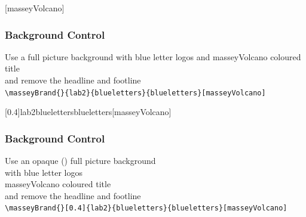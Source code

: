 \documentclass[10pt,aspectratio=43]{beamer}
\begin{document}
[masseyVolcano]

\begin{frame}
\frametitle{Background Control}
Use a full picture background with blue letter logos and masseyVolcano coloured title \\
and remove the headline and footline\\[2ex]
\verb|\masseyBrand{}{lab2}{blueletters}{blueletters}[masseyVolcano]|
\end{frame}

\masseyBrand{}[0.4]{lab2}{blueletters}{blueletters}[masseyVolcano]

\begin{frame}
\frametitle{Background Control}
\color{black}
Use an opaque (\backgroundfileopacity) full picture background \\with blue letter logos \\masseyVolcano coloured title \\
and remove the headline and footline\\[2ex]
\verb|\masseyBrand{}[0.4]{lab2}{blueletters}{blueletters}[masseyVolcano]|
\end{frame}




\begin{frame}[t]
\masseyTitlepage %

\raggedleft
\begin{mblock}[180pt]{0.7}{}
\raggedleft
\textbf{\insertauthor}\\
\insertdate
\end{mblock}
\vfill
\end{frame}

\masseyBrand{}{}{}{}
\end{document}
